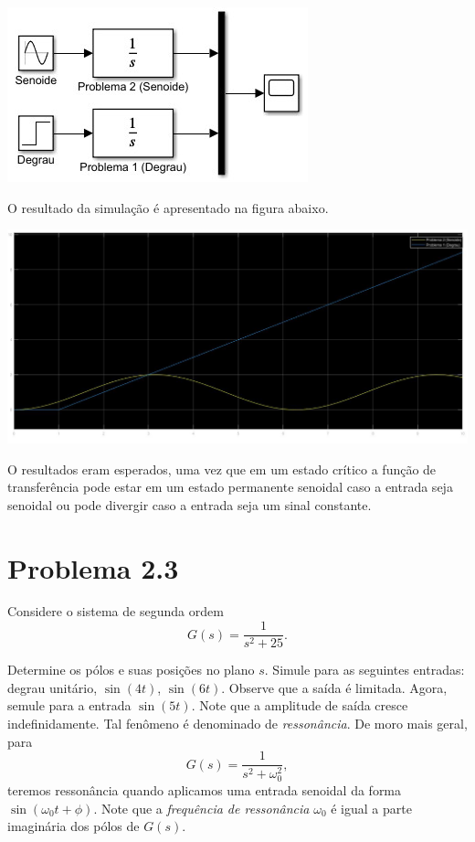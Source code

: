 \documentclass[
]{book}
\theoremstyle{definition}
\theoremstyle{definition}
\theoremstyle{definition}
\theoremstyle{remark}
\begin{document}
\includegraphics{Imagens/Lab2/simP2.jpg}

O resultado da simulação é apresentado na figura abaixo.

\includegraphics{Imagens/Lab2/prob2B.jpg}

O resultados eram esperados, uma vez que em um estado crítico a função de transferência pode estar em um estado permanente senoidal caso a entrada seja senoidal ou pode divergir caso a entrada seja um sinal constante.

\hypertarget{problema-2.3}{%
\section*{Problema 2.3}\label{problema-2.3}}

Considere o sistema de segunda ordem
\[
G(s) = \frac {1}{s^2 +25}.
\]

Determine os pólos e suas posições no plano \(s\). Simule para as seguintes entradas: degrau unitário, \(\sin (4t)\), \(\sin(6t)\). Observe que a saída é limitada. Agora, semule para a entrada \(\sin(5t)\). Note que a amplitude de saída cresce indefinidamente. Tal fenômeno é denominado de \emph{ressonância}. De moro mais geral, para
\[
G(s) = \frac {1}{s^2+\omega_0^2},
\]
teremos ressonância quando aplicamos uma entrada senoidal da forma \(\sin(\omega_0t + \phi)\). Note que a \emph{frequência de ressonância} \(\omega_0\) é igual a parte imaginária dos pólos de \(G(s)\).
\end{document}
